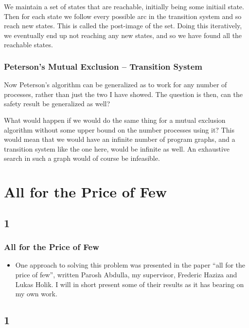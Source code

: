 \documentclass[handout]{beamer}
\begin{document}
\begin{footnotesize}
\begin{frame}
We maintain a set of states that are reachable, initially being some initiail state. Then for each state we follow every possible arc in the transition system and so reach new states. This is called the post-image of the set. Doing this iteratively, we eventually end up not reaching any new states, and so we have found all the reachable states.
\end{frame}

\begin{frame}
  \frametitle{Peterson's Mutual Exclusion -- Transition System}
Now Peterson's algorithm can be generalized as to work for any number of processes, rather than just the two I have showed. The question is then, can the safety result be generalized as well?

What would happen if we would do the same thing for a mutual exclusion algorithm without some upper bound on the number processes using it? This would mean that we would have an infinite number of program graphs, and a transition system like the one here, would be infinite as well. An exhaustive search in such a graph would of course be infeasible.
\end{frame}


\section{All for the Price of Few}
\subsection*{1}
\begin{frame}
  \frametitle{All for the Price of Few}
  \begin{itemize}
\item
One approach to solving this problem was presented in the paper ``all for the price of few'', written Parosh Abdulla, my supervisor, Frederic Haziza and Lukas Holik. I will in short present some of their results as it has bearing on my own work.


  \end{itemize}
\end{frame}

\subsection*{1}

\end{footnotesize}
\end{document}
